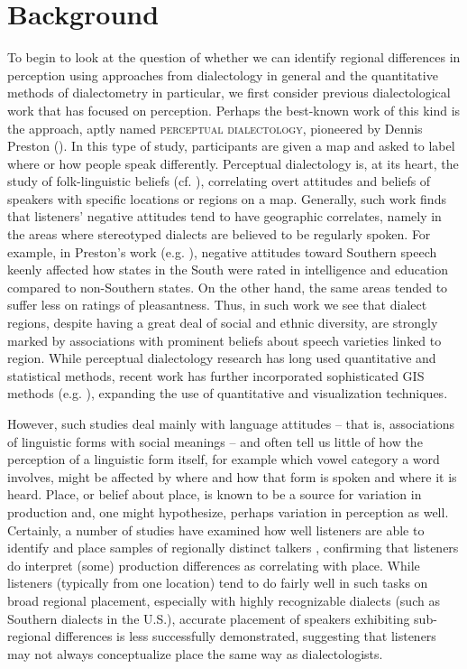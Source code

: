 \documentclass[output=paper]{LSP/langsci}
\begin{document}
\section{Background}
To begin to look at the question of whether we can identify regional differences in perception using approaches from dialectology in general and the quantitative methods of dialectometry in particular, we first consider previous dialectological work that has focused on perception. Perhaps the best-known work of this kind is the approach, aptly named \textsc{perceptual dialectology}, pioneered by Dennis Preston (\citeyear{preston_perceptual_1989,preston_folk_1993}). In this type of study, participants are given a map and asked to label where or how people speak differently. Perceptual dialectology is, at its heart, the study of folk-linguistic beliefs (cf. \citealt{niedzielski_folk_1999}), correlating overt attitudes and beliefs of speakers with specific locations or regions on a map. Generally, such work finds that listeners’ negative attitudes tend to have geographic correlates, namely in the areas where stereotyped dialects are believed to be regularly spoken. For example, in Preston’s work (e.g. \citeyear{preston_perceptual_1989}), negative attitudes toward Southern speech keenly affected how states in the South were rated in intelligence and education compared to non-Southern states. On the other hand, the same areas tended to suffer less on ratings of pleasantness. Thus, in such work we see that dialect regions, despite having a great deal of social and ethnic diversity, are strongly marked by associations with prominent beliefs about speech varieties linked to region. While perceptual dialectology research has long used quantitative and statistical methods, recent work has further incorporated sophisticated GIS methods (e.g. \citealt{evans_seattle_2013}), expanding the use of quantitative and visualization techniques.

However, such studies deal mainly with language attitudes – that is, associations of linguistic forms with social meanings – and often tell us little of how the perception of a linguistic form itself, for example which vowel category a word involves, might be affected by where and how that form is spoken and where it is heard. Place, or belief about place, is known to be a source for variation in production and, one might hypothesize, perhaps variation in perception as well. Certainly, a number of studies have examined how well listeners are able to identify and place samples of regionally distinct talkers \citep{clopper_acoustic_2004,clopper_free_2007,preston_where_1996,van_bezooijen_identification_1999}, confirming that listeners do interpret (some) production differences as correlating with place. While listeners (typically from one location) tend to do fairly well in such tasks on broad regional placement, especially with highly recognizable dialects (such as Southern dialects in the U.S.), accurate placement of speakers exhibiting sub-regional differences is less successfully demonstrated, suggesting that listeners may not always conceptualize place the same way as dialectologists.  
\end{document}
